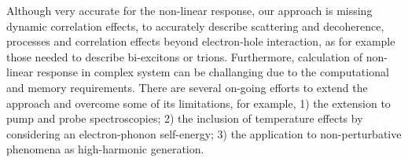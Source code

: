 Although very accurate for the non-linear response, our approach is missing dynamic correlation effects, to accurately describe scattering and decoherence, processes and correlation effects beyond electron-hole interaction, as for example those needed to describe bi-excitons or trions.\cite{schafer} Furthermore, calculation of non-linear response in complex system can be challanging due to the computational and memory requirements. 
There are several on-going efforts to extend the approach and overcome some of its limitations, for example, 1) the extension to pump and probe spectroscopies; 2) the inclusion of temperature effects by considering an electron-phonon self-energy; 3) the application to non-perturbative phenomena as high-harmonic generation.




